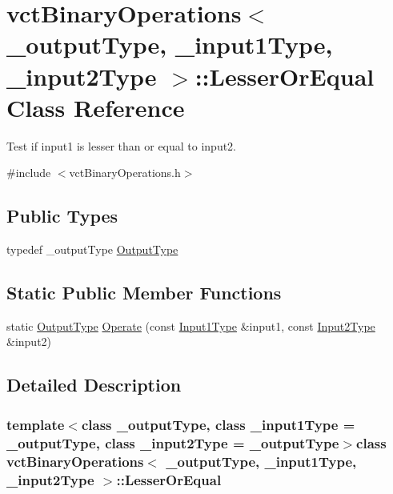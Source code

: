 \hypertarget{classvct_binary_operations_1_1_lesser_or_equal}{\section{vct\-Binary\-Operations$<$ \-\_\-output\-Type, \-\_\-input1\-Type, \-\_\-input2\-Type $>$\-:\-:Lesser\-Or\-Equal Class Reference}
\label{classvct_binary_operations_1_1_lesser_or_equal}
}


Test if input1 is lesser than or equal to input2.  




{\ttfamily \#include $<$vct\-Binary\-Operations.\-h$>$}

\subsection*{Public Types}
\begin{DoxyCompactItemize}
\item 
typedef \-\_\-output\-Type \hyperlink{classvct_binary_operations_1_1_lesser_or_equal_adff9c45eb56546ff372f5b7a614bb271}{Output\-Type}
\end{DoxyCompactItemize}
\subsection*{Static Public Member Functions}
\begin{DoxyCompactItemize}
\item 
static \hyperlink{classvct_binary_operations_1_1_lesser_or_equal_adff9c45eb56546ff372f5b7a614bb271}{Output\-Type} \hyperlink{classvct_binary_operations_1_1_lesser_or_equal_a1fbc00f49c2eaeaf287edd8c3537f5e3}{Operate} (const \hyperlink{classvct_binary_operations_a5e56a66a012d6a28c539a08a0021c45e}{Input1\-Type} \&input1, const \hyperlink{classvct_binary_operations_a929119af557a04a16b4d854981e49e1b}{Input2\-Type} \&input2)
\end{DoxyCompactItemize}


\subsection{Detailed Description}
\subsubsection*{template$<$class \-\_\-output\-Type, class \-\_\-input1\-Type = \-\_\-output\-Type, class \-\_\-input2\-Type = \-\_\-output\-Type$>$class vct\-Binary\-Operations$<$ \-\_\-output\-Type, \-\_\-input1\-Type, \-\_\-input2\-Type $>$\-::\-Lesser\-Or\-Equal}

